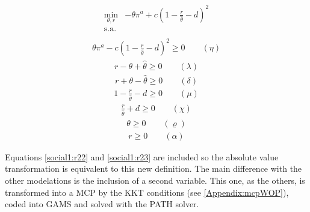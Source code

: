 \documentclass[a4paper,fleqn]{cas-dc}
\begin{document}
\begin{equation}
\begin{array}{rrclcl}
\displaystyle \min_{\theta,r} & -\theta \pi^a + c(1-\frac{r}{\hat{\theta}}-d)^2 \\\textrm{s.a.} \label{fo:social2}\\
\end{array}
\end{equation}
\begin{equation}
\begin{array}{rrclcl}
\displaystyle \theta \pi^a - c(1-\frac{r}{\hat{\theta}}-d)^2 \geq 0 \qquad (\eta)\label{social1:r12}
\end{array}
\end{equation}
\begin{equation}
\begin{array}{rrclcl}
\displaystyle r - \theta + \hat{\theta} \geq 0 \qquad (\lambda)\label{social1:r22}
\end{array}
\end{equation}
\begin{equation}
\begin{array}{rrclcl}
\displaystyle r + \theta - \hat{\theta} \geq 0 \qquad (\delta)\label{social1:r23}
\end{array}
\end{equation}
\begin{equation}
\begin{array}{rrclcl}
1-\frac{r}{\hat{\theta}}-d \geq 0 \qquad (\mu)\label{social1:r26}
\end{array}
\end{equation}
\begin{equation}
\begin{array}{rrclcl}
\frac{r}{\hat{\theta}} + d \geq 0 \qquad (\chi)\label{social1:r27}
\end{array}
\end{equation}
\begin{equation}
\begin{array}{rrclcl}
\theta \geq 0 \qquad (\varrho)\label{social1:r24}
\end{array}
\end{equation}
\begin{equation}
\begin{array}{rrclcl}
r \geq 0 \qquad (\alpha)\label{social1:r25}
\end{array}
\end{equation}

Equations \ref{social1:r22} and \ref{social1:r23} are included so the absolute value transformation is equivalent to this new definition. The main difference with the other modelations is the inclusion of a second variable. This one, as the others, is transformed into a MCP by the KKT conditions (see \ref{Appendix:mcpWOP}), coded into GAMS and solved with the PATH solver.
\end{document}
